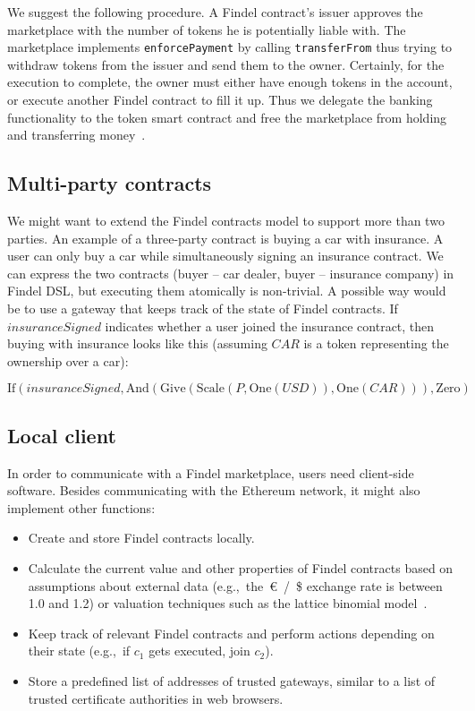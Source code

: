 We suggest the following procedure.
A Findel contract's issuer approves the marketplace with the number of tokens he is potentially liable with.
The marketplace implements \texttt{enforcePayment} by calling \texttt{transferFrom} thus trying to withdraw tokens from the issuer and send them to the owner.
Certainly, for the execution to complete, the owner must either have enough tokens in the account, or execute another Findel contract to fill it up.
Thus we delegate the banking functionality to the token smart contract and free the marketplace from holding and transferring money~\cite{Khovratovich2016}.


\subsection{Multi-party contracts}

We might want to extend the Findel contracts model to support more than two parties.
An example of a three-party contract is buying a car with insurance.
A user can only buy a car while simultaneously signing an insurance contract.
We can express the two contracts (buyer -- car dealer, buyer -- insurance company) in Findel DSL, but executing them atomically is non-trivial.
A possible way would be to use a gateway that keeps track of the state of Findel contracts.
If \(insuranceSigned\) indicates whether a user joined the insurance contract, then buying with insurance looks like this (assuming \(CAR\) is a token representing the ownership over a car):

\[\mathrm{If}(insuranceSigned,\mathrm{And}(\mathrm{Give}(\mathrm{Scale}(P,\mathrm{One}(USD)),\mathrm{One}(CAR))),\mathrm{Zero})\]


\subsection{Local client}

In order to communicate with a Findel marketplace, users need client-side software.
Besides communicating with the Ethereum network, it might also implement other functions:
\begin{itemize}
	\item Create and store Findel contracts locally.
	\item Calculate the current value and other properties of Findel contracts based on assumptions about external data (e.g.,~the~\euro~/~\$ exchange rate is between 1.0 and 1.2) or valuation techniques such as the lattice binomial model~\cite{Cox1979}.
	\item Keep track of relevant Findel contracts and perform actions depending on their state (e.g.,~if \(c_1\) gets executed, join \(c_2\)).
	\item Store a predefined list of addresses of trusted gateways, similar to a list of trusted certificate authorities in web browsers.
\end{itemize}


